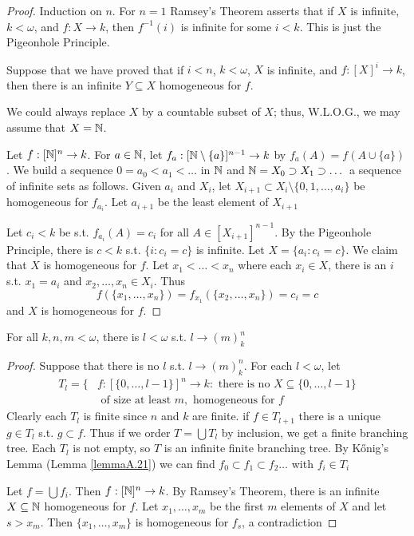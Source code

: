 \documentclass[11pt]{article}
\begin{document}
\begin{proof}
Induction on \(n\). For \(n=1\) Ramsey's Theorem asserts that if \(X\) is infinite, \(k<\omega\),
and \(f:X\to k\), then \(f^{-1}(i)\) is infinite for some \(i<k\). This is just the Pigeonhole
Principle.

Suppose that we have proved that if \(i<n\), \(k<\omega\), \(X\) is infinite, and \(f:[X]^i\to k\), then
there is an infinite \(Y\subseteq X\) homogeneous for \(f\).

We could always replace \(X\) by a countable subset of \(X\); thus, W.L.O.G., we may assume
that \(X=\mathbb{N}\).

Let \(f:[\mathbb{N}]^n\to k\). For \(a\in\mathbb{N}\), let \(f_a:[\mathbb{N}\setminus\{a\}]^{n-1}\to k\) by \(f_a(A)=f(A\cup\{a\})\). We build a
sequence \(0=a_0<a_1<\dots\) in \(\mathbb{N}\) and \(\mathbb{N}=X_0\supset X_1\supset\dots\) a sequence of infinite sets as follows.
Given \(a_i\) and \(X_i\), let \(X_{i+1}\subset X_i\setminus\{0,1,\dots,a_i\}\) be homogeneous for \(f_{a_i}\).
Let \(a_{i+1}\) be the least element of \(X_{i+1}\)

Let \(c_i<k\) be s.t. \(f_{a_i}(A)=c_i\) for all \(A\in[X_{i+1}]^{n-1}\). By the Pigeonhole
Principle, there is \(c<k\) s.t. \(\{i:c_i=c\}\) is infinite. Let \(X=\{a_i:c_i=c\}\). We claim
that \(X\) is homogeneous for \(f\). Let \(x_1<\dots<x_n\) where each \(x_i\in X\), there is an \(i\)
s.t. \(x_1=a_i\) and \(x_2,\dots,x_n\in X_i\). Thus
\begin{equation*}
f(\{x_1,\dots,x_n\})=f_{x_1}(\{x_2,\dots,x_n\})=c_i=c
\end{equation*}
and \(X\) is homogeneous for \(f\).
\end{proof}

\begin{theorem}
For all \(k,n,m<\omega\), there is \(l<\omega\) s.t. \(l\to(m)^n_k\)
\end{theorem}

\begin{proof}
Suppose that there is no \(l\) s.t. \(l\to (m)_k^n\). For each \(l<\omega\),
let
\begin{align*}
T_l=\{&f:[\{0,\dots,l-1\}]^n\to k:\text{ there is no }X\subseteq\{0,\dots,l-1\}\\
&\text{ of size at least }m, \text{ homogeneous for }f
\end{align*}
Clearly each \(T_l\) is finite since \(n\) and \(k\) are finite. if \(f\in T_{l+1}\) there is a
unique \(g\in T_l\) s.t. \(g\subset f\). Thus if we order \(T=\bigcup T_l\) by inclusion, we get a finite
branching tree. Each \(T_l\) is not empty, so \(T\) is an infinite finite branching tree. By
Kőnig's Lemma (Lemma \ref{lemmaA.21}) we can find \(f_0\subset f_1\subset f_2\dots\) with \(f_i\in T_i\)

Let \(f=\bigcup f_i\). Then \(f:[\mathbb{N}]^n\to k\). By Ramsey's Theorem, there is an infinite \(X\subseteq\mathbb{N}\)
homogeneous for \(f\). Let \(x_1,\dots,x_m\) be the first \(m\) elements of \(X\) and let \(s>x_m\).
Then \(\{x_1,\dots,x_m\}\) is homogeneous for \(f_s\), a contradiction
\end{proof}
\end{document}
